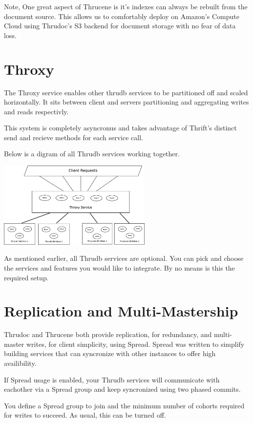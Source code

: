 \documentclass[nocopyrightspace,blockstyle]{sigplanconf}
\begin{document}
Note, One great aspect of Thrucene is it's indexes can always be rebuilt from the document source. 
This allows us to comfortably deploy on Amazon's Compute Cloud using Thrudoc's S3 backend for 
document storage with no fear of data loss.   

\section{Throxy}

The Throxy service enables other thrudb services to be partitioned off and scaled horizontally.  
It sits between client and servers partitioning and aggregating writes and reads respectivly.

This system is completely asyncronus and takes advantage of  
Thrift's distinct send and recieve methods for each service call. 

Below is a digram of all Thrudb services working together.

\includegraphics[width=3.00in]{Throxy.eps}

As mentioned earlier, all Thrudb services are optional. You can pick and choose the services and features you would like to integrate. 
By no means is this the required setup.

\section{Replication and Multi-Mastership}

Thrudoc and Thrucene both provide replication, for redundancy, and multi-master writes, for client simplicity, using 
Spread.  Spread was written to simplify building services that can syncronize with other instances to offer high availibility.  

If Spread usage is enabled, your Thrudb services will communicate with eachother via a Spread group and keep syncronized using two phased commits.

You define a Spread group to join and the minimum number of cohorts required for writes to succeed.  As usual, this can be turned off. 
\end{document}
